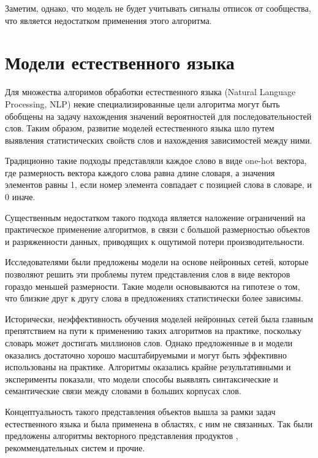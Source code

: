 \documentclass[times,specification,annotation]{itmo-student-thesis}
\begin{document}
Заметим, однако, что модель не будет учитывать сигналы отписок от сообщества, что является недостатком применения этого алгоритма. 

\section{Модели естественного языка}\label{sec:nlp-intro}

Для множества алгоримов обработки естественного языка (Natural Language Processing, NLP) некие специализированные цели алгоритма могут быть обобщены на задачу нахождения значений вероятностей для последовательностей слов.
Таким образом, развитие моделей естественного языка шло путем выявления статистических свойств слов и нахождения зависимостей между ними.

Традиционно такие подходы представляли каждое слово в виде one-hot вектора, где размерность вектора каждого слова равна длине словаря, а значения элементов равны 1, если номер элемента совпадает с позицией слова в словаре, и 0 иначе.  

Существенным недостатком такого подхода является наложение ограничений на практическое применение алгоритмов, в связи с большой размерностью объектов и разряженности данных, приводящих к ощутимой потери производительности.

Исследователями были предложены модели на основе нейронных сетей\cite{turian2010}, которые позволяют решить эти проблемы путем представления слов в виде векторов гораздо меньшей размерности. Такие модели основываются на гипотезе о том, что близкие друг к другу слова в предложениях статистически более зависимы.

Исторически, неэффективность обучения моделей нейронных сетей была главным препятствием на пути к применению таких алгоритмов на практике, поскольку словарь может достигать миллионов слов. Однако предложенные в \cite{mikolov2013efficient} и \cite{mikolov2013distributed} модели оказались достаточно хорошо масштабируемыми и могут быть эффективно использованы на практике. Алгоритмы оказались крайне результативными и эксперименты показали, что модели способы выявлять синтаксические и семантические связи между словами в больших корпусах слов. 

Концептуальность такого представления объектов вышла за рамки задач естественного языка и была применена в областях, с ним не связанных. Так были предложены алгоритмы векторного представления продуктов \cite{grbovic2015commerce}, рекоммендательных систем \cite{ozsoy2016word} и прочие.
\end{document}
